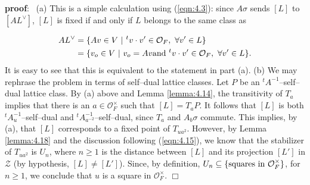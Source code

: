 \documentclass[12pt,letterpaper]{amsart}
\numberwithin{equation}{section}
\theoremstyle{definition}
\theoremstyle{plain}
\providecommand{\cal}{\mathcal}
\def\zz{{\cal Z}}
\def\pf{{\bf proof}:\ }
\def\qed{$\Box$}
\def\off{{\cal O}_F}
\begin{document}
\pf
(a) This is a simple calculation using (\ref{eqn:4.3}): 
since $A\sigma$ sends $[L]$
to $[AL^{\vee}]$, $[L]$ is fixed if and only if $L$ belongs to the same
class as

\[
\begin{split}
AL^{\vee}
&=\{Av\in V\ |\ {^{t}v}\cdot v'\in \off ,
\ \forall v'\in L\}\\
&=\{v_o\in V\ |\  v_o=Av{\rm  and }\ {^{t}v}\cdot v'\in \off ,
\ \forall v'\in L\}.
\end{split}
\]
It is easy to see that this is equivalent to the statement in part (a).
\newline
(b) We may rephrase the problem in terms of self--dual lattice
classes. 
Let $P$ be an $^tA^{-1}$--self--dual lattice class. 
By (a) above and Lemma \ref{lemma:4.14},
the transitivity of $T_a$ implies that
there is an $a\in\off^{\times}$ such that $[L]=T_aP$. It follows that
$[L]$ is both
$^tA_u^{-1}$--self--dual and $^tA_{a^{-2}}^{-1}$--self--dual, since $T_a$ and
$A_b\sigma$ commute. 
This implies, by (a), that $[L]$ corresponds to a fixed
point of $T_{ua^2}$. 
However, by Lemma \ref{lemma:4.18} and the discussion following 
(\ref{eqn:4.15}), we know that the stabilizer of 
$T_{ua^2}$ is $U_n$,
where $n\geq 1$ is the distance between $[L]$ and its
projection $[L']$ in $\zz$ (by hypothesis, $[L]\not= [L']$).
Since, by definition,
$U_n \subseteq \{ {\rm squares\ in\ }\off^{\times}\}$, for $n\geq 1$, we
conclude that $u$ is a square in $\off^{\times}$.
\qed
\end{document}
